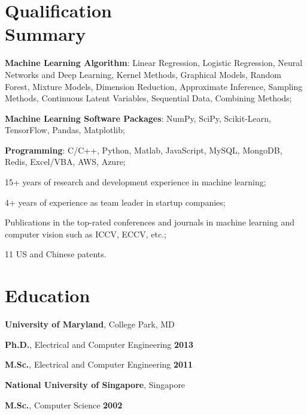 \documentclass[margin,line]{resume}
\begin{document}
\begin{resume}
    \section{\mysidestyle Qualification\\Summary}
         \begin{list2}
			\item  \textbf{Machine Learning Algorithm}: Linear Regression, Logistic Regression, Neural Networks and Deep Learning, Kernel Methods, Graphical Models, Random Forest, Mixture Models, Dimension Reduction, Approximate Inference, Sampling Methods, Continuous Latent Variables, Sequential Data, Combining Methods;
			\item  \textbf{Machine Learning Software Packages}: NumPy, SciPy, Scikit-Learn, TensorFlow, Pandas, Matplotlib;
			\item  \textbf{Programming}: C/C++, Python, Matlab, JavaScript, MySQL, MongoDB, Redis, Excel/VBA, AWS, Azure;
			\item  15+ years of research and development experience in machine learning;
                   \item   4+ years of experience as team leader in startup companies;
                   \item  Publications in the top-rated conferences and journals in machine learning and computer vision such as ICCV, ECCV, etc.;
                   \item  11 US and Chinese patents.
         \end{list2}
    
    \section{\mysidestyle Education}
    \textbf{University of Maryland}, College Park, MD       \\
    \vspace{-3mm}
    \begin{list2}
        \item \textbf{Ph.D.}, Electrical and Computer Engineering \hfill \textbf{2013} 
        \item \textbf{M.Sc.}, Electrical and Computer Engineering \hfill \textbf{2011}
    \end{list2}

    \textbf{National University of Singapore}, Singapore  \\
    \vspace{-3mm}
        \begin{list2}
        \item \textbf{M.Sc.}, Computer Science \hfill \textbf{2002}
    \end{list2}


\end{resume}
\end{document}
